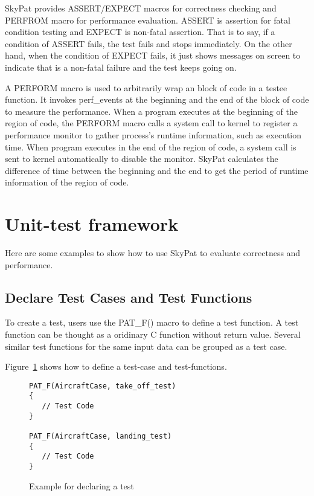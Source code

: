 \documentclass[final]{ols}
\begin{document}
SkyPat provides ASSERT/EXPECT macros for correctness checking and PERFROM macro for performance evaluation.
ASSERT is assertion for fatal condition testing and EXPECT is non-fatal assertion.
That is to say, if a condition of ASSERT fails, the test fails and stops immediately.
On the other hand, when the condition of EXPECT fails, it just shows messages on screen to indicate that is a non-fatal failure and the test keeps going on.

A PERFORM macro is used to arbitrarily wrap an block of code in a testee function.
It invokes perf\_events at the beginning and the end of the block of code to measure the performance.
When a program executes at the beginning of the region of code, the PERFORM macro calls a system call to kernel to register a performance monitor to gather process's runtime information, such as execution time.
When program executes in the end of the region of code, a system call is sent to kernel automatically to disable the monitor.
SkyPat calculates the difference of time between the beginning and the end to get the period of runtime information of the region of code.

\section{Unit-test framework}

Here are some examples to show how to use SkyPat to evaluate correctness and performance.

\subsection{Declare Test Cases and Test Functions}

To create a test, users use the PAT\_F() macro to define a test function.
A test function can be thought as a oridinary C function without return value.
Several similar test functions for the same input data can be grouped as a test case.

Figure~\ref{aircraftcase} shows how to define a test-case and test-functions.

\begin{figure}[h]
\lstset{language=C++}
\begin{lstlisting}[frame=single]
PAT_F(AircraftCase, take_off_test)
{
   // Test Code
}

PAT_F(AircraftCase, landing_test)
{
   // Test Code
}
\end{lstlisting}
\caption{Example for declaring a test}
\label{aircraftcase}
\end{figure}
\end{document}
